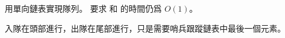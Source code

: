 \startEXERCISE
用單向鏈表實現隊列。
要求  和  的時間仍爲 $O(1)$。
\stopEXERCISE

\startANSWER
入隊在頭部進行，出隊在尾部進行，只是需要哨兵跟蹤鏈表中最後一個元素。
\stopANSWER
